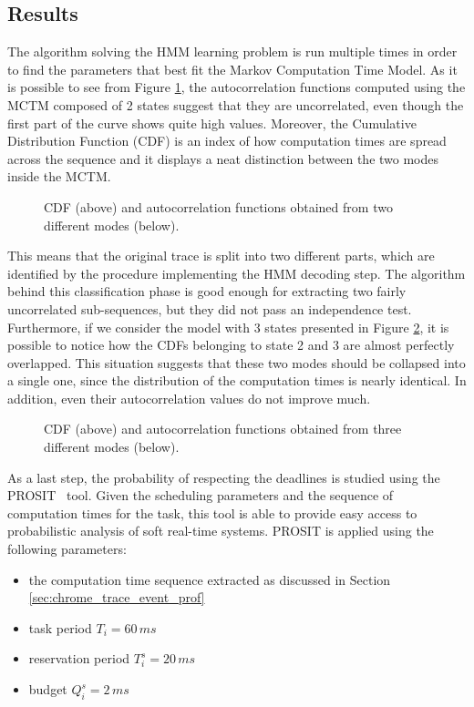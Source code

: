 \subsection{Results}\label{sec:mctm_results}
The algorithm solving the HMM learning problem is run multiple times in order to
find the parameters that best fit the Markov Computation Time Model.
As it is possible to see from Figure \ref{img:mctm_2_states}, the autocorrelation
functions computed using the MCTM composed of 2 states suggest that they are
uncorrelated, even though the first part of the curve shows quite high values.
Moreover, the Cumulative Distribution Function (CDF) is an index of how computation
times are spread across the sequence and it displays a neat distinction between
the two modes inside the MCTM.
\begin{figure}[!htb]
    \caption{CDF (above) and autocorrelation functions obtained from two
        different modes (below).}
    \label{img:mctm_2_states}
\end{figure}

This means that the original trace is split into two different parts, which
are identified by the procedure implementing the HMM decoding step. The algorithm
behind this classification phase is good enough for extracting two fairly
uncorrelated sub-sequences, but they did not pass an independence test.
Furthermore, if we consider the model with 3 states presented in Figure
\ref{img:mctm_3_states}, it is possible to notice how the CDFs belonging to state
2 and 3 are almost perfectly overlapped. This situation suggests that these two
modes should be collapsed into a single one, since the distribution of the
computation times is nearly identical. In addition, even their autocorrelation
values do not improve much.
\begin{figure}[!htb]
    \caption{CDF (above) and autocorrelation functions obtained from three
        different modes (below).}
    \label{img:mctm_3_states}
\end{figure}

As a last step, the probability of respecting the deadlines is studied using the
PROSIT~\cite{palopoli2014tool} tool. Given the scheduling parameters and the
sequence of computation times for the task, this tool is able to provide easy
access to probabilistic analysis of soft real-time systems. PROSIT is applied using
the following parameters:
\begin{itemize}
    \item the computation time sequence extracted as discussed in Section
        \ref{sec:chrome_trace_event_prof}
    \item task period \( T_i = 60\,ms \)
    \item reservation period \( T_{i}^s = 20\,ms \)
    \item budget \( Q_{i}^s = 2\,ms \)
\end{itemize}

